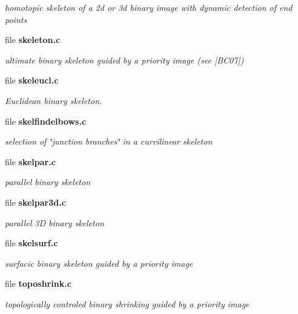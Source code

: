 \begin{DoxyCompactItemize}
\begin{DoxyCompactList}\small\item\em homotopic skeleton of a 2d or 3d binary image with dynamic detection of end points \item\end{DoxyCompactList}

\item 
file {\bf skeleton.c}


\begin{DoxyCompactList}\small\item\em ultimate binary skeleton guided by a priority image (see [BC07]) \item\end{DoxyCompactList}

\item 
file {\bf skeleucl.c}


\begin{DoxyCompactList}\small\item\em Euclidean binary skeleton. \item\end{DoxyCompactList}

\item 
file {\bf skelfindelbows.c}


\begin{DoxyCompactList}\small\item\em selection of \char`\"{}junction branches\char`\"{} in a curvilinear skeleton \item\end{DoxyCompactList}

\item 
file {\bf skelpar.c}


\begin{DoxyCompactList}\small\item\em parallel binary skeleton \item\end{DoxyCompactList}

\item 
file {\bf skelpar3d.c}


\begin{DoxyCompactList}\small\item\em parallel 3D binary skeleton \item\end{DoxyCompactList}

\item 
file {\bf skelsurf.c}


\begin{DoxyCompactList}\small\item\em surfacic binary skeleton guided by a priority image \item\end{DoxyCompactList}

\item 
file {\bf toposhrink.c}


\begin{DoxyCompactList}\small\item\em topologically controled binary shrinking guided by a priority image \item\end{DoxyCompactList}

\end{DoxyCompactItemize}

